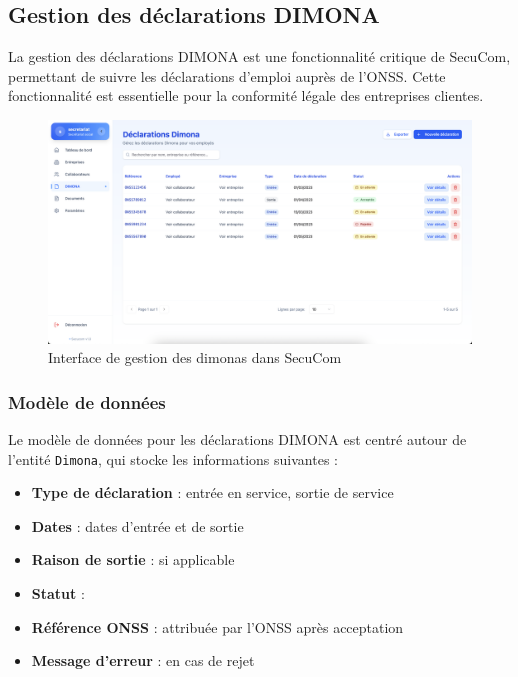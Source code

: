 \subsection{Gestion des déclarations DIMONA}

La gestion des déclarations DIMONA est une fonctionnalité critique de SecuCom, permettant de suivre les déclarations d'emploi auprès de l'ONSS. Cette fonctionnalité est essentielle pour la conformité légale des entreprises clientes.

\vspace{0.5cm}

\begin{figure}[H]
  \centering
  \includegraphics[width=1\textwidth]{SecuComPreviewDimona.png}
  \caption{Interface de gestion des dimonas dans SecuCom}
  \label{fig:companyInterface}
\end{figure}

\subsubsection{Modèle de données}

Le modèle de données pour les déclarations DIMONA est centré autour de l'entité \texttt{Dimona}, qui stocke les informations suivantes :

\vspace{0.5cm}

\begin{itemize}[leftmargin=*,label=\textcolor{darkgray}{$\bullet$},itemsep=0.3em]
  \item \textbf{Type de déclaration} : entrée en service, sortie de service
  \item \textbf{Dates} : dates d'entrée et de sortie
  \item \textbf{Raison de sortie} : si applicable
  \item \textbf{Statut} : 
  \item \textbf{Référence ONSS} : attribuée par l'ONSS après acceptation
  \item \textbf{Message d'erreur} : en cas de rejet
\end{itemize}

